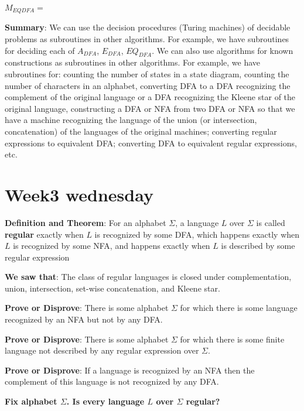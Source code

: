 \documentclass[12pt, oneside]{article}
\begin{document}
$M_{EQDFA} = $ 


  \vfill
  

  {\bf Summary}:  We can use the decision procedures (Turing machines) of decidable problems
  as subroutines in other algorithms. For example, we have subroutines for deciding each of 
  $A_{DFA}$, $E_{DFA}$, $EQ_{DFA}$.  We can also use algorithms for known constructions
  as subroutines in other algorithms. For example, we have subroutines for: counting the number 
  of states in a state diagram, counting the number of characters in an alphabet, converting DFA
  to a DFA recognizing the complement of the original language or a DFA recognizing the 
  Kleene star of the original language, constructing a DFA or NFA from two DFA or NFA so that 
  we have a machine recognizing the language of the union (or intersection, concatenation)
  of the languages of the original machines; converting regular expressions to equivalent DFA; 
  converting DFA to equivalent regular expressions, etc.
 \vfill
\section*{Week3 wednesday}


{\bf Definition and Theorem}: For an alphabet $\Sigma$, a language $L$ over $\Sigma$ is called {\bf regular}
exactly when $L$ is recognized by some DFA, which happens exactly when $L$ is recognized by some NFA, 
and happens exactly when $L$ is described by some regular expression

{\bf We saw that}: The class of regular languages is closed under complementation, union, 
intersection, set-wise concatenation, and Kleene star.

{\bf Prove or Disprove}: There is some alphabet $\Sigma$ for which there is 
some language recognized by an NFA but not by any DFA.

\vfill

{\bf Prove or Disprove}: There is some alphabet $\Sigma$ for which there is 
some finite language not described by any regular expression over $\Sigma$.

\vfill

{\bf Prove or Disprove}: If a language is recognized by an NFA 
then the complement of this language is not recognized by any DFA.

\vfill

\newpage

{\bf Fix alphabet $\Sigma$. Is every language $L$ over $\Sigma$ regular?}
\end{document}
